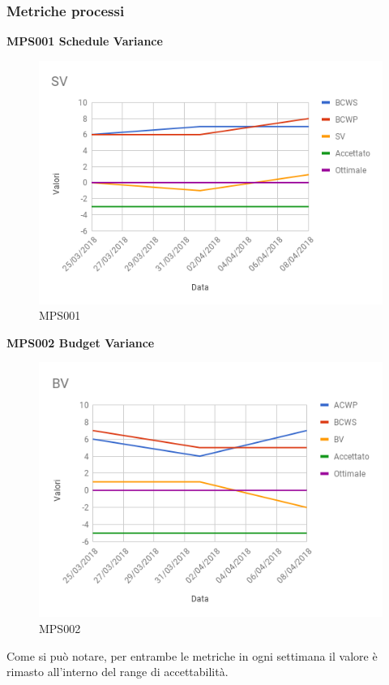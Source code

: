 \documentclass[PianoDiQualifica.tex]{subfiles}
\begin{document}
\subsubsection{Metriche processi}

\textbf{MPS001 Schedule Variance}
\begin{figure}[htb]
	\centering
	\includegraphics[width=0.5\linewidth]{RQ/SV}
	\caption{MPS001}
	\label{fig:processi}
\end{figure}

\textbf{MPS002 Budget Variance}
\begin{figure}[htb]
	\centering
	\includegraphics[width=0.5\linewidth]{RQ/BV}
	\caption{MPS002}
	\label{fig:processi}
\end{figure}
Come si può notare, per entrambe le metriche in ogni settimana il valore è rimasto all'interno del range di accettabilità.
\end{document}
